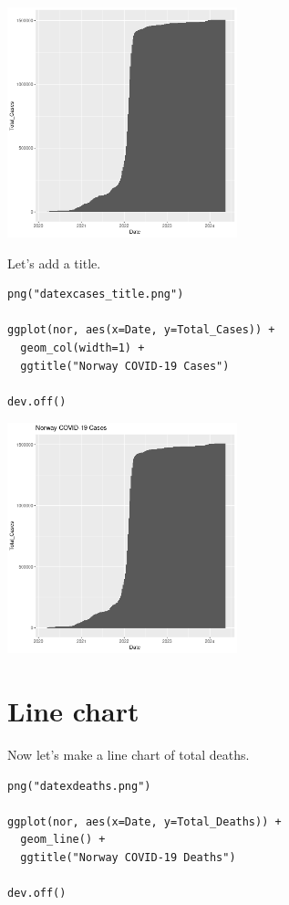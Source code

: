 \documentclass[
]{book}
\begin{document}
\includegraphics[width=0.5\textwidth,height=\textheight]{./Figures/datexcases.png}

Let's add a title.

\begin{verbatim}
png("datexcases_title.png")

ggplot(nor, aes(x=Date, y=Total_Cases)) +
  geom_col(width=1) +
  ggtitle("Norway COVID-19 Cases")

dev.off()
\end{verbatim}

\includegraphics[width=0.5\textwidth,height=\textheight]{./Figures/datexcases_title.png}

\hypertarget{line-chart}{%
\section{Line chart}\label{line-chart}}

Now let's make a line chart of total deaths.

\begin{verbatim}
png("datexdeaths.png")

ggplot(nor, aes(x=Date, y=Total_Deaths)) +
  geom_line() +
  ggtitle("Norway COVID-19 Deaths")

dev.off()
\end{verbatim}
\end{document}
